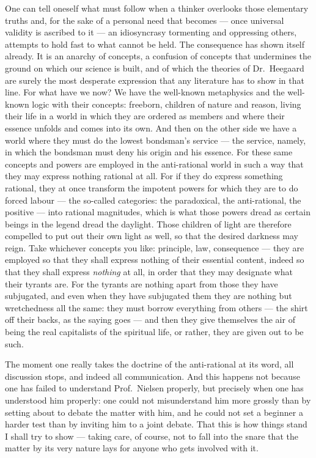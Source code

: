 \documentclass[12pt,a4paper]{book}
\newcommand{\opage}[1]{\marginnote{\footnotesize\textit{[#1]}}}
\begin{document}
\opage{47}One can tell oneself what must follow when a thinker overlooks those
elementary truths and, for the sake of a personal need that becomes --- once
universal validity is ascribed to it --- an idiosyncrasy tormenting and
oppressing others, attempts to hold fast to what cannot be held. The
consequence has shown itself already. It is an anarchy of concepts, a confusion
of concepts that undermines the ground on which our science is built, and of
which the theories of Dr.\ Heegaard are surely the most desperate expression
that any literature has to show in that line. For what have we now? We have the
well-known metaphysics and the well-known logic with their concepts: freeborn,
children of nature and reason, living their life in a world in which they are
ordered as members and where their essence unfolds and comes into its own. And
then on the other side we have a world where they must do the lowest bondsman's
service --- the service, namely, in which the bondsman must deny his origin and
his essence. For these same concepts and powers are employed in the
anti-rational world in such a way that they may express nothing
\opage{48}rational at all. For if they do express something rational, they at
once transform the impotent powers for which they are to do forced labour ---
the so-called categories: the paradoxical, the anti-rational, the positive ---
into rational magnitudes, which is what those powers dread as certain beings in
the legend dread the daylight. Those children of light are therefore compelled
to put out their own light as well, so that the desired darkness may reign.
Take whichever concepts you like: principle, law, consequence --- they are
employed so that they shall express nothing of their essential content, indeed
so that they shall express \emph{nothing} at all, in order that they may
designate what their tyrants are. For the tyrants are nothing apart from those
they have subjugated, and even when they have subjugated them they are nothing
but wretchedness all the same: they must borrow everything from others --- the
shirt off their backs, as the saying goes --- and then they give themselves the
air of being the real capitalists of the spiritual life, or rather, they are
given out to be such.

The moment one really takes the doctrine of the anti-rational at its word, all
discussion stops, and indeed all communication. And this happens not because
one has failed to understand Prof.\ Nielsen properly, but precisely when one
has understood him properly: one could not misunderstand him more grossly than
by setting about to debate the matter with him, and he could not set a beginner
a harder test than by inviting him to a joint debate. That this is how things
stand I shall try to show --- taking care, of course,
\opage{49}not to fall into the snare that the matter by its very nature lays
for anyone who gets involved with it.
\end{document}
